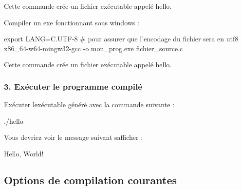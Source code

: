 \begin{DoxyEnumerate}
\item Cette commande crée un fichier exécutable appelé {\ttfamily hello}.
\item Compiler un exe fonctionnant sous windows \+:
\end{DoxyEnumerate}


\begin{DoxyCode}
export LANG=C.UTF-8 # pour assurer que l'encodage du fichier sera en utf8
x86\_64-w64-mingw32-gcc -o mon\_prog.exe fichier\_source.c
\end{DoxyCode}



\begin{DoxyEnumerate}
\item Cette commande crée un fichier exécutable appelé {\ttfamily hello}. \subsubsection*{3. Exécuter le programme compilé}
\end{DoxyEnumerate}


\begin{DoxyEnumerate}
\item Exécuter l\textquotesingle{}exécutable généré avec la commande suivante \+: 
\begin{DoxyCode}
./hello
\end{DoxyCode}

\item Vous devriez voir le message suivant s\textquotesingle{}afficher \+: 
\begin{DoxyCode}
Hello, World!
\end{DoxyCode}

\end{DoxyEnumerate}

\subsection*{Options de compilation courantes}



